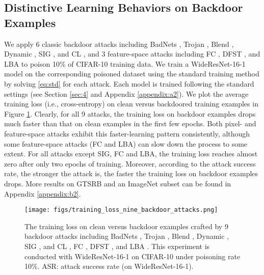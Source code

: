 \subsection{Distinctive Learning Behaviors on Backdoor Examples}
We apply 6 classic backdoor attacks including BadNets \cite{gu2017badnets}, Trojan \cite{liu2018trojaning}, Blend \cite{chen2017targeted}, Dynamic \cite{nguyen2020input}, SIG \cite{barni2019new}, and CL \cite{turner2019clean}, and 3 feature-space attacks including FC \cite{shafahi2018poison}, DFST \cite{cheng2021deep}, and LBA \cite{yao2019latent} to poison 10\% of CIFAR-10 training data. We train a WideResNet-16-1 model \cite{zagoruyko2016wide} on the corresponding poisoned dataset using the standard training method by solving \eqref{eq:std} for each attack. Each model is trained following the standard settings (see Section \ref{sec:4} and Appendix \ref{appendix:a2}). We plot the average training loss (i.e., cross-entropy) on clean versus backdoored training examples in Figure \ref{img2}. Clearly, for all 9 attacks, the training loss on backdoor examples drops much faster than that on clean examples in the first few epochs. Both pixel- and feature-space attacks exhibit this faster-learning pattern consistently, although some feature-space attacks (FC and LBA) can slow down the process to some extent. For all attacks except SIG, FC and LBA, the training loss reaches almost zero after only two epochs of training. Moreover, according to the attack success rate, the stronger the attack is, the faster the training loss on backdoor examples drops. More results on GTSRB and an ImageNet subset can be found in Appendix \ref{appendix:b2}.

\begin{figure}[!tp]
	\centering
	\texttt{[image: figs/training\_loss\_nine\_backdoor\_attacks.png]}
	\vspace{-0.1 in}
	\caption{The training loss on clean versus backdoor examples crafted by 9 backdoor attacks including BadNets \cite{gu2017badnets}, Trojan \cite{liu2018trojaning}, Blend \cite{chen2017targeted}, Dynamic \cite{nguyen2020input}, SIG \cite{barni2019new}, and CL \cite{turner2019clean}, FC \cite{shafahi2018poison}, DFST \cite{cheng2021deep}, and LBA \cite{yao2019latent}. This experiment is conducted with WideResNet-16-1 \cite{zagoruyko2016wide} on CIFAR-10 under poisoning rate 10\%. ASR: attack success rate (on WideResNet-16-1).}
	\label{img2}
	\vspace{-0.1in}
\end{figure}

